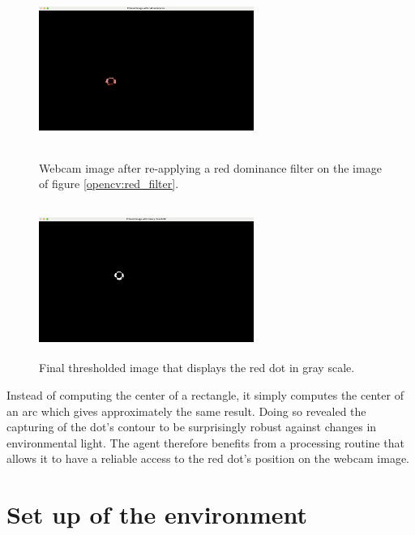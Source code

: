 \begin{figure}[H]

  \begin{minipage}[b]{0.45\linewidth}
   \centering
   \includegraphics[width=7cm,height=5cm]{Images/additional_red_filter.png}
   \caption{Webcam image after re-applying a red dominance filter on the image of figure \ref{opencv:red_filter}.}
   \label{opencv:add_filter}
  \end{minipage}
\hfill
  \begin{minipage}[b]{0.45\linewidth}
   \centering
   \includegraphics[width=7cm,height=5cm]{Images/threshold.png}
   \caption{Final thresholded image that displays the red dot in gray scale.}
   \label{opencv:threshold}
  \end{minipage}
\end{figure}

Instead of computing the center of a rectangle, it simply computes the center of an arc which gives approximately the same result. Doing so revealed the capturing of the dot's contour to be surprisingly robust against changes in environmental light. The agent therefore benefits from a processing routine \texttt{} that allows it to have a reliable access to the red dot's position on the webcam image.

\section{Set up of the environment}

